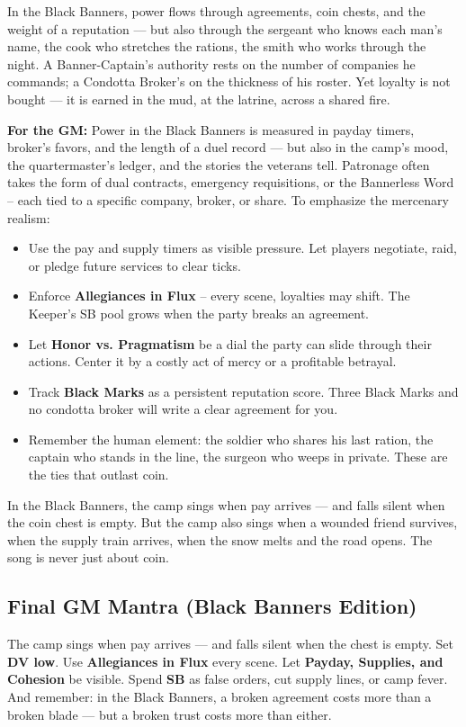\begin{tcolorbox}[colback=black!3,colframe=black!40!white,title={Patronage \& Power},breakable]
In the Black Banners, power flows through agreements, coin chests, and the weight of a reputation --- but also through the sergeant who knows each man's name, the cook who stretches the rations, the smith who works through the night. A Banner-Captain's authority rests on the number of companies he commands; a Condotta Broker's on the thickness of his roster. Yet loyalty is not bought --- it is earned in the mud, at the latrine, across a shared fire.

\textbf{For the GM:}  
Power in the Black Banners is measured in payday timers, broker's favors, and the length of a duel record --- but also in the camp's mood, the quartermaster's ledger, and the stories the veterans tell. Patronage often takes the form of dual contracts, emergency requisitions, or the Bannerless Word -- each tied to a specific company, broker, or share. To emphasize the mercenary realism:
\begin{itemize}
    \item Use the pay and supply timers as visible pressure. Let players negotiate, raid, or pledge future services to clear ticks.
    \item Enforce \textbf{Allegiances in Flux} -- every scene, loyalties may shift. The Keeper's SB pool grows when the party breaks an agreement.
    \item Let \textbf{Honor vs. Pragmatism} be a dial the party can slide through their actions. Center it by a costly act of mercy or a profitable betrayal.
    \item Track \textbf{Black Marks} as a persistent reputation score. Three Black Marks and no condotta broker will write a clear agreement for you.
    \item Remember the human element: the soldier who shares his last ration, the captain who stands in the line, the surgeon who weeps in private. These are the ties that outlast coin.
\end{itemize}
In the Black Banners, the camp sings when pay arrives --- and falls silent when the coin chest is empty. But the camp also sings when a wounded friend survives, when the supply train arrives, when the snow melts and the road opens. The song is never just about coin.
\end{tcolorbox}

\subsection*{Final GM Mantra (Black Banners Edition)}
The camp sings when pay arrives --- and falls silent when the chest is empty. Set \textbf{DV low}. Use \textbf{Allegiances in Flux} every scene. Let \textbf{Payday, Supplies, and Cohesion} be visible. Spend \textbf{SB} as false orders, cut supply lines, or camp fever. And remember: in the Black Banners, a broken agreement costs more than a broken blade --- but a broken trust costs more than either.

